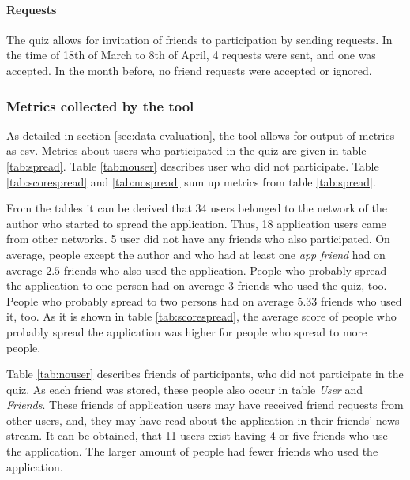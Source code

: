 \documentclass[preprint,12pt]{elsarticle}
\begin{document}
\paragraph{Requests}
The quiz allows for invitation of friends to participation by sending
requests. In the time of 18th of March to 8th of April, 4 requests
were sent, and one was accepted. In the month before, no friend
requests were accepted or ignored.

\subsubsection{Metrics collected by the tool}
\label{sec:tool-metrics}
As detailed in section \ref{sec:data-evaluation}, the tool allows for
output of metrics as \ac{csv}. Metrics about users who participated in
the quiz are given in table
\ref{tab:spread}. Table \ref{tab:nouser}
describes user who did not participate. Table \ref{tab:scorespread}
and \ref{tab:nospread} sum up metrics from table \ref{tab:spread}.

From the tables it can be derived that 34 users belonged to the
network of the author who started to spread the application. Thus, 18
application users came from other networks. 5 user did not have any
friends who also participated. On average, people except the author
and who had at least one \textit{app friend} had on average $2.5$ friends who also
used the application. People who probably spread the application to
one person had on average $3$ friends who used the quiz, too. People
who probably spread to two persons had on average $5.33$ friends who
used it, too. As it is shown in table \ref{tab:scorespread},
the average score of people who probably spread 
the application was higher for people who spread to more people. 

Table \ref{tab:nouser} describes friends of participants, who did not
participate in the quiz. As each friend was stored, these people also
occur in table \textit{User} and \textit{Friends}. These friends of
application users may have received friend requests from other users,
and, they may have read about the application in their friends' news
stream.
It can be obtained, that 11 users exist having 4 or five friends who
use the application. The larger amount of people had fewer friends who
used the application.
\end{document}
